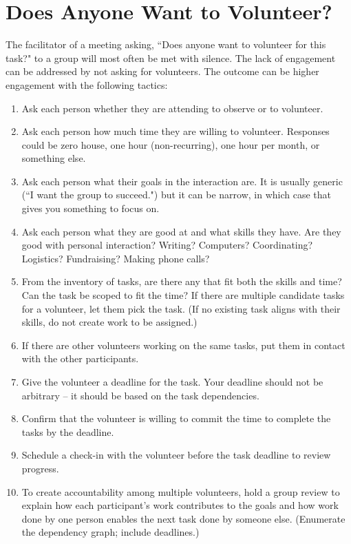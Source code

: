 \section{Does Anyone Want to Volunteer?}


The facilitator of a meeting asking, ``Does anyone want to volunteer for this task?" to a group will most often be met with silence. 
The lack of engagement can be addressed by not asking for volunteers. The outcome can be higher engagement with the following tactics:
\begin{enumerate}
    \item Ask each person whether they are attending to observe or to volunteer.
    \item Ask each person how much time they are willing to volunteer. Responses could be zero house, one hour (non-recurring), one hour per month, or something else.
    \item Ask each person what their goals in the interaction are. It is usually generic (``I want the group to succeed.") but it can be narrow, in which case that gives you something to focus on.
    \item Ask each person what they are good at and what skills they have. Are they good with personal interaction? Writing? Computers? Coordinating? Logistics? Fundraising? Making phone calls?
    \item From the inventory of tasks, are there any that fit both the skills and time? Can the task be scoped to fit the time? If there are multiple candidate tasks for a volunteer, let them pick the task. (If no existing task aligns with their skills, do not create work to be assigned.)
    \item If there are other volunteers working on the same tasks, put them in contact with the other participants.
    \item Give the volunteer a deadline for the task. Your deadline should not be arbitrary -- it should be based on the task dependencies. 
    \item Confirm that the volunteer is willing to commit the time to complete the tasks by the deadline.
    \item Schedule a check-in with the volunteer before the task deadline to review progress.
    \item To create accountability among multiple volunteers, hold a group review to explain how each participant's work contributes to the goals and how work done by one person enables the next task done by someone else. (Enumerate the dependency graph; include deadlines.)
\end{enumerate}
